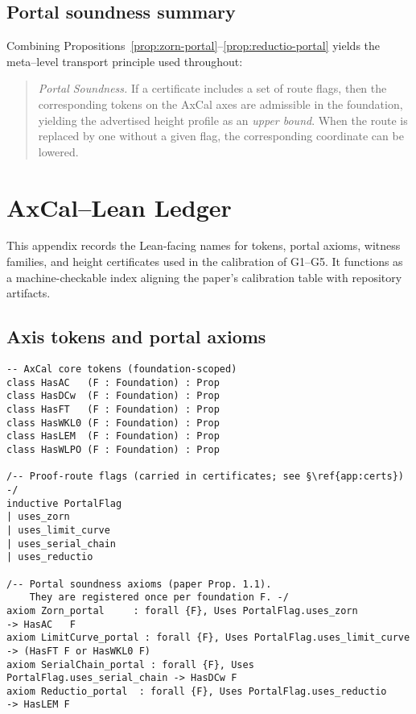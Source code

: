 \documentclass[11pt]{article}
\theoremstyle{definition}
\theoremstyle{remark}
\begin{document}
\subsection{Portal soundness summary}

Combining Propositions~\ref{prop:zorn-portal}–\ref{prop:reductio-portal} yields the meta–level transport principle used throughout:
\begin{quote}
\emph{Portal Soundness.} If a certificate includes a set of route flags, then the corresponding tokens on the AxCal axes are admissible in the foundation, yielding the advertised height profile as an \emph{upper bound}. When the route is replaced by one without a given flag, the corresponding coordinate can be lowered.
\end{quote}

\section{AxCal--Lean Ledger}\label{app:ledger}

This appendix records the Lean-facing names for tokens, portal axioms, witness families, and height certificates used in the calibration of G1--G5. It functions as a machine-checkable index aligning the paper's calibration table with repository artifacts.

\subsection{Axis tokens and portal axioms}\label{app:tokens-portals}

\begin{verbatim}
-- AxCal core tokens (foundation-scoped)
class HasAC   (F : Foundation) : Prop
class HasDCw  (F : Foundation) : Prop
class HasFT   (F : Foundation) : Prop
class HasWKL0 (F : Foundation) : Prop
class HasLEM  (F : Foundation) : Prop
class HasWLPO (F : Foundation) : Prop

/-- Proof-route flags (carried in certificates; see §\ref{app:certs}) -/
inductive PortalFlag
| uses_zorn
| uses_limit_curve
| uses_serial_chain
| uses_reductio

/-- Portal soundness axioms (paper Prop. 1.1). 
    They are registered once per foundation F. -/
axiom Zorn_portal     : forall {F}, Uses PortalFlag.uses_zorn         -> HasAC   F
axiom LimitCurve_portal : forall {F}, Uses PortalFlag.uses_limit_curve -> (HasFT F or HasWKL0 F)
axiom SerialChain_portal : forall {F}, Uses PortalFlag.uses_serial_chain -> HasDCw F
axiom Reductio_portal  : forall {F}, Uses PortalFlag.uses_reductio     -> HasLEM F
\end{verbatim}
\end{document}
